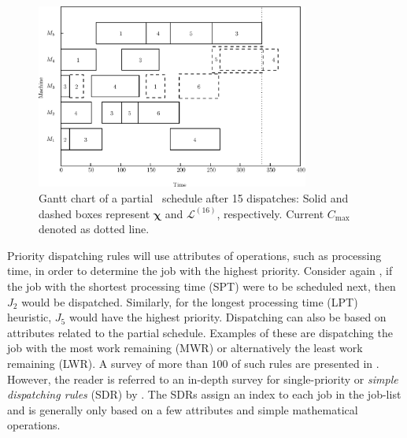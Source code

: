 \documentclass[smallextended]{svjour3}
\renewcommand{\vchi}{\bm \chi}
\begin{document}
\begin{figure}[t!]\centering
	\includegraphics[width=0.8\textwidth]{figures/jssp_example_nocolor}
	\caption[Gantt chart of a partial \JSP~schedule]{Gantt chart of a
		partial \JSP~schedule after 15 dispatches: Solid and dashed boxes
		represent $\vchi$ and $\mathcal{L}^{(16)}$, respectively. Current
		$C_{\max}$ denoted as dotted line.}
	\label{fig:jssp:example}
\end{figure}




Priority dispatching rules will use attributes of operations, such as processing time, 
in order to determine the job with the highest priority. 
Consider again , if the job with the shortest processing 
time (SPT) were to be scheduled next, then $J_2$ would be dispatched. 
Similarly, for the longest processing time (LPT) heuristic, $J_5$ would have the highest priority. 
Dispatching can also be based on attributes related to the partial schedule. 
Examples of these are dispatching the job with the most work remaining (MWR) or 
alternatively the least work remaining (LWR). A survey of more than $100$ of 
such rules are presented in \citet{Panwalkar77}. 
However, the reader is referred to an in-depth survey for single-priority or 
\emph{simple dispatching rules} (SDR) by \citet{Haupt89}.  
The SDRs assign an index to each job in the job-list and is generally only based on a
few attributes and simple mathematical operations.
\end{document}
